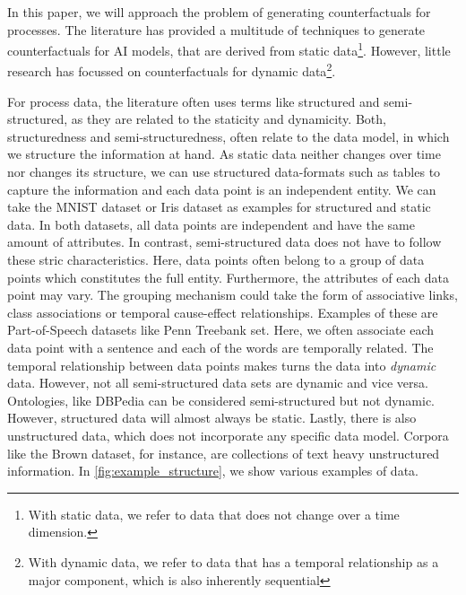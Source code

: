 \documentclass[./../../paper.tex]{subfiles}
\begin{document}
In this paper, we will approach the problem of generating counterfactuals for processes. The literature has provided a multitude of techniques to generate counterfactuals for AI models, that are derived from static data\footnote{With static data, we refer to data that does not change over a time dimension.}. However, little research has focussed on counterfactuals for dynamic data\footnote{With dynamic data, we refer to data that has a temporal relationship as a major component, which is also inherently sequential}.  

For process data, the literature often uses terms like structured and semi-structured, as they are related to the staticity and dynamicity. Both, structuredness and semi-structuredness, often relate to the data model, in which we structure the information at hand. As static data neither changes over time nor changes its structure, we can use structured data-formats such as tables to capture the information and each data point is an independent entity. We can take the MNIST dataset\autocite{deng_MNISTDatabaseHandwritten_2012} or Iris dataset\autocites{anderson_SpeciesProblemIris_1936,fisher_UseMultipleMeasurements_1936} as examples for structured and static data. In both datasets, all data points are independent and have the same amount of attributes. In contrast, semi-structured data does not have to follow these stric characteristics. Here, data points often belong to a group of data points which constitutes the full entity. Furthermore, the attributes of each data point may vary. The grouping mechanism could take the form of associative links, class associations or temporal cause-effect relationships. Examples of these are Part-of-Speech datasets like Penn Treebank set\autocite{marcus_Buildinglargeannotated_1993}. Here, we often associate each data point with a sentence and each of the words are temporally related. The temporal relationship between data points makes turns the data into \emph{dynamic} data. However, not all semi-structured data sets are dynamic and vice versa. Ontologies, like DBPedia\autocite{auer_DBpedianucleusweb_2007} can be considered semi-structured but not dynamic. However, structured data will almost always be static. Lastly, there is also unstructured data, which does not incorporate any specific data model. Corpora like the Brown dataset\autocite{francis79browncorpus}, for instance, are collections of text heavy unstructured information. In \autoref{fig:example_structure}, we show various examples of data.

\end{document}
